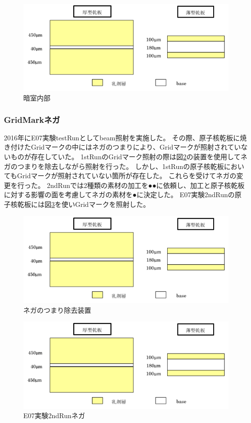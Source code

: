 \documentclass[12pt,a4paper]{jarticle}
\begin{document}
\begin{figure}[htbp]
  \centering
     \includegraphics[width=140mm]{emulsionorder.png}
  \caption{暗室内部\label{fig:into_darkroom}}
\end{figure}
\subsubsection{GridMarkネガ}
2016年にE07実験testRunとしてbeam照射を実施した。
その際、原子核乾板に焼き付けたGridマークの中にはネガのつまりにより、Gridマークが照射されていないものが存在していた。
1stRunのGridマーク照射の際は図\ref{fig:nega_cleaner}の装置を使用してネガのつまりを除去しながら照射を行った。
しかし、1stRunの原子核乾板においてもGridマークが照射されていない箇所が存在した。
これらを受けてネガの変更を行った。
2ndRunでは2種類の素材の加工を●●に依頼し、加工と原子核乾板に対する影響の面を考慮してネガの素材を●に決定した。
E07実験2ndRunの原子核乾板には図\ref{fig:nega_2ndRun}を使いGridマークを照射した。
\begin{figure}[htbp]
  \centering
    \includegraphics[width=140mm]{emulsionorder.png}
  \caption{ネガのつまり除去装置\label{fig:nega_cleaner}}
\end{figure}
\begin{figure}[htbp]
  \centering
    \includegraphics[width=140mm]{emulsionorder.png}
  \caption{E07実験2ndRunネガ\label{fig:nega_2ndRun}}
\end{figure}
\end{document}

